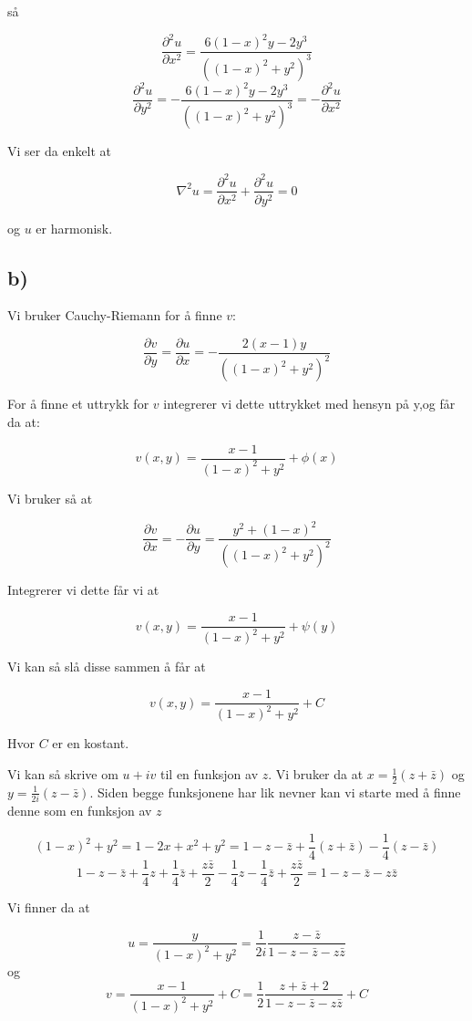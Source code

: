 \documentclass[a4paper,norsk, 10pt]{article}
\begin{document}
så

$$
\frac{\partial^2 u}{\partial x^2} = \frac{6(1-x)^2y - 2y^3}{((1-x)^2 + y^2)^3}
$$
$$
\frac{\partial^2 u}{\partial y^2} = -\frac{6(1-x)^2y - 2y^3}{((1-x)^2 + y^2)^3} = -\frac{\partial^2 u}{\partial x^2}
$$


Vi ser da enkelt at

$$
\nabla^2 u = \frac{\partial^2 u}{\partial x^2} +\frac{\partial^2 u}{\partial y^2} =  0
$$

og $u$ er harmonisk.

\subsection*{b)}

Vi bruker Cauchy-Riemann for å finne $v$:

$$
\frac{\partial v}{\partial y} = \frac{\partial u}{\partial x} = -\frac{2(x-1)y}{((1-x)^2 + y^2)^2}
$$

For å finne et uttrykk for $v$ integrerer vi dette uttrykket med hensyn på y,og får da at:

$$
v(x,y) = \frac{x-1}{(1-x)^2 + y^2} + \phi (x)
$$

Vi bruker så at

$$
\frac{\partial v}{\partial x} = -\frac{\partial u}{\partial y} = \frac{y^2 + (1-x)^2}{((1-x)^2 + y^2)^2} 
$$

Integrerer vi dette får vi at

$$
v(x,y) = \frac{x-1}{(1-x)^2 + y^2} + \psi (y)
$$

Vi kan så slå disse sammen å får at

$$
v(x,y) = \frac{x-1}{(1-x)^2 + y^2} + C
$$

Hvor $C$ er en kostant.

Vi kan så skrive om $u+iv$ til en funksjon av $z$. Vi bruker da at $x = \frac{1}{2}(z+\bar{z})$ og $y = \frac{1}{2i}(z-\bar{z})$. Siden begge funksjonene har lik nevner kan vi starte med å finne denne som en funksjon av $z$

$$
(1-x)^2 + y^2 = 1 - 2x + x^2 + y^2 = 1 - z -\bar{z} + \frac{1}{4}(z+\bar{z}) - \frac{1}{4}(z-\bar{z}) 
$$
$$
1 - z -\bar{z} + \frac{1}{4} z + \frac{1}{4} \bar{z} +\frac{z\bar{z}}{2} - \frac{1}{4} z - \frac{1}{4} \bar{z} +\frac{z\bar{z}}{2} = 1 - z - \bar{z} - z\bar{z}
$$

Vi finner da at

$$
u = \frac{y}{(1-x)^2 + y^2} = \frac{1}{2i}\frac{z-\bar{z}}{1 - z - \bar{z} - z\bar{z}}
$$
og
$$
v = \frac{x-1}{(1-x)^2 + y^2} + C = \frac{1}{2}\frac{z+\bar{z} + 2}{1 - z - \bar{z} - z\bar{z}} + C
$$
\end{document}

